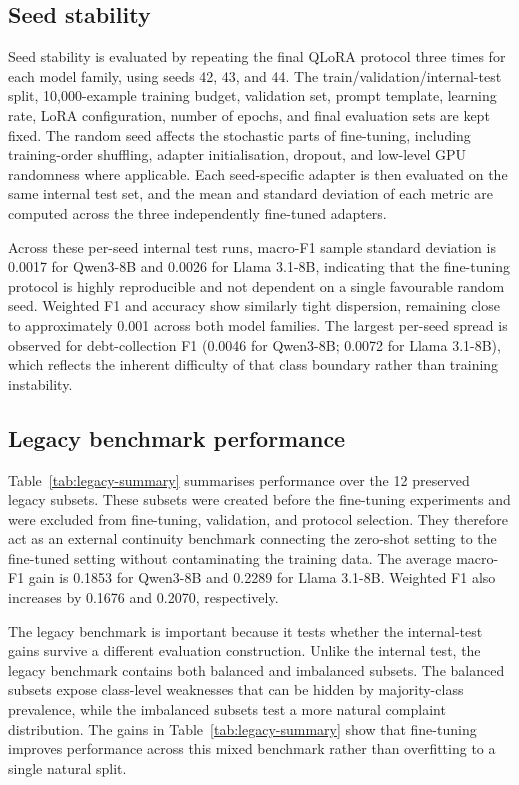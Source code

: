 \documentclass{elektr}
\begin{document}
\subsection{Seed stability}

Seed stability is evaluated by repeating the final QLoRA protocol three times for each model family, using seeds 42, 43, and 44. The train/validation/internal-test split, 10,000-example training budget, validation set, prompt template, learning rate, LoRA configuration, number of epochs, and final evaluation sets are kept fixed. The random seed affects the stochastic parts of fine-tuning, including training-order shuffling, adapter initialisation, dropout, and low-level GPU randomness where applicable. Each seed-specific adapter is then evaluated on the same internal test set, and the mean and standard deviation of each metric are computed across the three independently fine-tuned adapters.

Across these per-seed internal test runs, macro-F1 sample standard deviation is 0.0017 for Qwen3-8B and 0.0026 for Llama 3.1-8B, indicating that the fine-tuning protocol is highly reproducible and not dependent on a single favourable random seed. Weighted F1 and accuracy show similarly tight dispersion, remaining close to approximately 0.001 across both model families. The largest per-seed spread is observed for debt-collection F1 (0.0046 for Qwen3-8B; 0.0072 for Llama 3.1-8B), which reflects the inherent difficulty of that class boundary rather than training instability.

\subsection{Legacy benchmark performance}

Table~\ref{tab:legacy-summary} summarises performance over the 12 preserved legacy subsets. These subsets were created before the fine-tuning experiments and were excluded from fine-tuning, validation, and protocol selection. They therefore act as an external continuity benchmark connecting the zero-shot setting to the fine-tuned setting without contaminating the training data. The average macro-F1 gain is 0.1853 for Qwen3-8B and 0.2289 for Llama 3.1-8B. Weighted F1 also increases by 0.1676 and 0.2070, respectively.

The legacy benchmark is important because it tests whether the internal-test gains survive a different evaluation construction. Unlike the internal test, the legacy benchmark contains both balanced and imbalanced subsets. The balanced subsets expose class-level weaknesses that can be hidden by majority-class prevalence, while the imbalanced subsets test a more natural complaint distribution. The gains in Table~\ref{tab:legacy-summary} show that fine-tuning improves performance across this mixed benchmark rather than overfitting to a single natural split.
\end{document}
